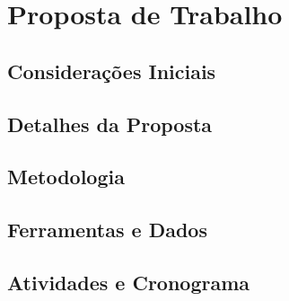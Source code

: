 \chapter{Proposta de Trabalho}
\label{cap-proposta}


\section{Considerações Iniciais}

\section{Detalhes da Proposta}

\section{Metodologia}

\section{Ferramentas e Dados}

\section{Atividades e Cronograma}
%
